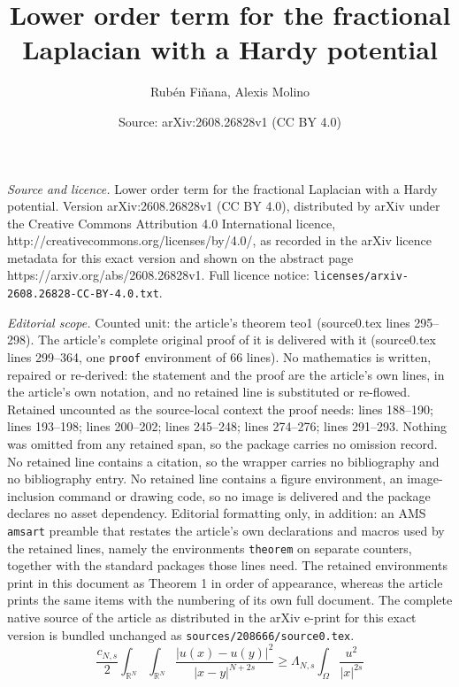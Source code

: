 \documentclass[10pt,a4paper]{amsart}
\title{Lower order term for the fractional Laplacian with a Hardy potential}
\author{Rub\'en Fi\~nana, Alexis Molino}
\date{Source: arXiv:2608.26828v1 (CC BY 4.0)}
\begin{document}
\maketitle

\noindent\emph{Source and licence.} Lower order term for the fractional Laplacian with a Hardy potential. Version arXiv:2608.26828v1 (CC BY 4.0), distributed by arXiv under the Creative Commons Attribution 4.0 International licence, http://creativecommons.org/licenses/by/4.0/, as recorded in the arXiv licence metadata for this exact version and shown on the abstract page https://arxiv.org/abs/2608.26828v1. Full licence notice: \texttt{licenses/arxiv-2608.26828-CC-BY-4.0.txt}.\par\smallskip

\noindent\textit{Editorial scope.} Counted unit: the article's theorem teo1 (source0.tex lines 295--298). The article's complete original proof of it is delivered with it (source0.tex lines 299--364, one \texttt{proof} environment of 66 lines). No mathematics is written, repaired or re-derived: the statement and the proof are the article's own lines, in the article's own notation, and no retained line is substituted or re-flowed.  Retained uncounted as the source-local context the proof needs: lines 188--190; lines 193--198; lines 200--202; lines 245--248; lines 274--276; lines 291--293.  Nothing was omitted from any retained span, so the package carries no omission record.  No retained line contains a citation, so the wrapper carries no bibliography and no bibliography entry.  No retained line contains a figure environment, an image-inclusion command or drawing code, so no image is delivered and the package declares no asset dependency.  Editorial formatting only, in addition: an AMS \texttt{amsart} preamble that restates the article's own declarations and macros used by the retained lines, namely the environments \texttt{theorem} on separate counters, together with the standard packages those lines need.  The retained environments print in this document as Theorem 1 in order of appearance, whereas the article prints the same items with the numbering of its own full document.  The complete native source of the article as distributed in the arXiv e-print for this exact version is bundled unchanged as \texttt{sources/208666/source0.tex}.
		\begin{equation}\label{DesigualdadHardy}
			\frac{c_{N,s}}{2}\int_{\mathbb{R}^N}\int_{\mathbb{R}^N} \frac{|u(x)-u(y)|^2}{|x-y|^{N+2s}}\geq \Lambda_{N,s}\int_{\Omega} \frac{u^2}{|x|^{2s}}
		\end{equation}		
\end{document}
